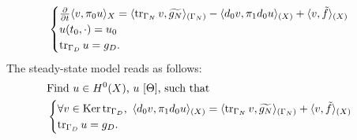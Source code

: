 \begin{discussion}
\begin{equation}
\begin{split}
\begin{cases}
          \frac{\partial}{\partial t} \langle v,\pi_0 u\rangle_X =
            \langle\mathop{\rm tr}\nolimits_{\Gamma_N} v,\widetilde{g_N}\rangle_{(\Gamma_N)}
          - \langle d_0 v,\pi_1 d_0 u\rangle_{(X)}
          + \langle v,\tilde{f}\rangle_{(X)} \\
        u(t_0, \cdot) = u_0 \\
        \mathop{\rm tr}\nolimits_{\Gamma_D} u = g_D.
      \end{cases}
    \end{split}
  \end{equation}
  The steady-state model reads as follows:
  \begin{equation}
    \begin{split}
      & \text{Find $u \in H^0(X)$, $u\ [\Theta]$, such that} \\
      &
      \begin{cases}
        \forall v \in \mathop{\rm Ker}\nolimits \mathop{\rm tr}\nolimits_{\Gamma_D},\
          \langle d_0 v,\pi_1 d_0 u\rangle_{(X)}
          = \langle\mathop{\rm tr}\nolimits_{\Gamma_N} v,\widetilde{g_N}\rangle_{(\Gamma_N)}
          + \langle v,\tilde{f}\rangle_{(X)} \\
        \mathop{\rm tr}\nolimits_{\Gamma_D} u = g_D.
      \end{cases}
    \end{split}
  \end{equation}
\end{discussion}
